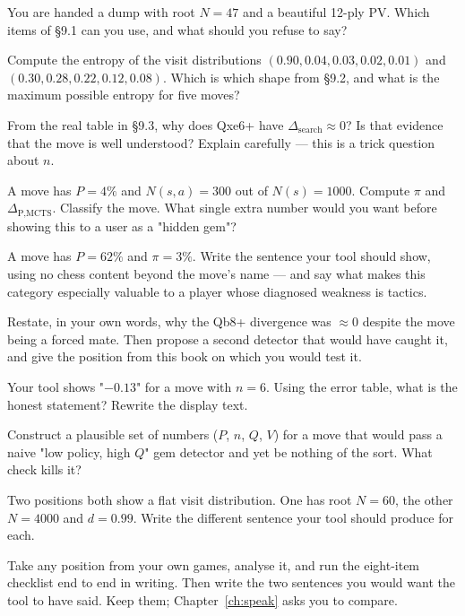 \begin{exercises}

 You are handed a dump with root $N = 47$ and a beautiful
12-ply PV. Which items of §9.1 can you use, and what should you refuse to say?

 Compute the entropy of the visit distributions
$(0.90,0.04,0.03,0.02,0.01)$ and $(0.30,0.28,0.22,0.12,0.08)$. Which is which shape from
§9.2, and what is the maximum possible entropy for five moves?

 From the real table in §9.3, why does Qxe6+ have
$\Delta_{\text{search}} \approx 0$? Is that evidence that the move is well understood?
Explain carefully --- this is a trick question about $n$.

 A move has $P = 4\%$ and $N(s,a) = 300$ out of
$N(s) = 1000$. Compute $\pi$ and $\Delta_{\text{P,MCTS}}$. Classify the move. What single
extra number would you want before showing this to a user as a "hidden gem"?

 A move has $P = 62\%$ and $\pi = 3\%$. Write the sentence your
tool should show, using no chess content beyond the move's name --- and say what makes this
category especially valuable to a player whose diagnosed weakness is tactics.

 Restate, in your own words, why the Qb8+
divergence was $\approx 0$ despite the move being a forced mate. Then propose a second
detector that would have caught it, and give the position from this book on which you would
test it.

 Your tool shows "$-0.13$" for a move with $n = 6$. Using the
error table, what is the honest statement? Rewrite the display text.

 Construct a plausible set of numbers ($P$, $n$, $Q$, $V$) for
a move that would pass a naive "low policy, high $Q$" gem detector and yet be nothing of the
sort. What check kills it?

 Two positions both show a flat visit distribution. One
has root $N = 60$, the other $N = 4000$ and $d = 0.99$. Write the different sentence your
tool should produce for each.

 Take any position from your own games,
analyse it, and run the eight-item checklist end to end in writing. Then write the two
sentences you would want the tool to have said. Keep them; Chapter~\ref{ch:speak} asks you to
compare.

\end{exercises}
